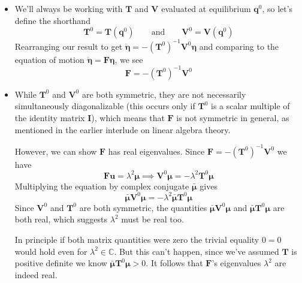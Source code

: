 \documentclass[11pt, a4paper]{article}
\newcommand{\eqtext}[1]{\qquad \text{#1} \qquad}
\newcommand{\bddot}[1]{\ddot{\bm{#1}}} %
\newcommand{\mat}[1]{\mathbf{#1}} %
\begin{document}
\begin{itemize}
	\item We'll always be working with $ \mat{T} $ and $ \mat{V} $ evaluated at equilibrium $ \bm{q}^{0} $, so let's define the shorthand
	\begin{equation*}
		\mat{T}^{0} = \mat{T}(\bm{q}^{0}) \eqtext{and} \mat{V}^{0} = \mat{V}(\bm{q}^{0})
	\end{equation*}
	Rearranging our result to get $ \bddot{\eta} = - \left(\mat{T}^{0}\right)^{-1}\mat{V}^{0} \bm{\eta} $ and comparing to the equation of motion $ \bddot{\eta} = \mat{F} \bm{\eta} $, we see
	\begin{equation*}
		\mat{F} = - \left (\mat{T}^{0}\right )^{-1} \mat{V}^{0}
	\end{equation*}
	
	\item While $ \mat{T}^{0} $ and $ \mat{V}^{0} $ are both symmetric, they are not necessarily simultaneously diagonalizable (this occurs only if $ \mat{T}^{0} $ is a scalar multiple of the identity matrix $ \mat{I} $), which means that $ \mat{F} $ is not symmetric in general, as mentioned in the earlier interlude on linear algebra theory.
	
	However, we can show $ \bm{F} $ has real eigenvalues. Since $ \mat{F} = - \left (\mat{T}^{0}\right )^{-1} \mat{V}^{0} $ we have
	\begin{equation*}
		\mat{F}\bm{u} = \lambda^{2} \bm{\mu} \implies \mat{V}^{0}\bm{\mu} = - \lambda^{2} \mat{T}^{0} \bm{\mu}
	\end{equation*}
	Multiplying the equation by complex conjugate $ \bar{\bm{\mu}} $ gives
	\begin{equation*}
		\bar{\bm{\mu}} \mat{V}^{0}\bm{\mu} = - \lambda^{2} \bar{\bm{\mu}} \mat{T}^{0} \bm{\mu}
	\end{equation*}
	Since $ \mat{V}^{0}  $ and $ \mat{T}^{0} $ are both symmetric, the quantities $ \bar{\bm{\mu}} \mat{V}^{0}\bm{\mu} $ and $ \bar{\bm{\mu}} \mat{T}^{0} \bm{\mu} $ are both real, which suggests $ \lambda^{2} $ must be real too.
	
	In principle if both matrix quantities were zero the trivial equality $ 0 = 0 $ would hold even for $ \lambda^{2} \in \mathbb{C} $. But this can't happen, since we've assumed $ \mat{T} $ is positive definite we know $\bar{\bm{\mu}} \mat{T}^{0} \bm{\mu} > 0 $. It follows that $ \mat{F} $'s eigenvalues $ \lambda^{2} $ are indeed real.
\end{itemize}
\end{document}
